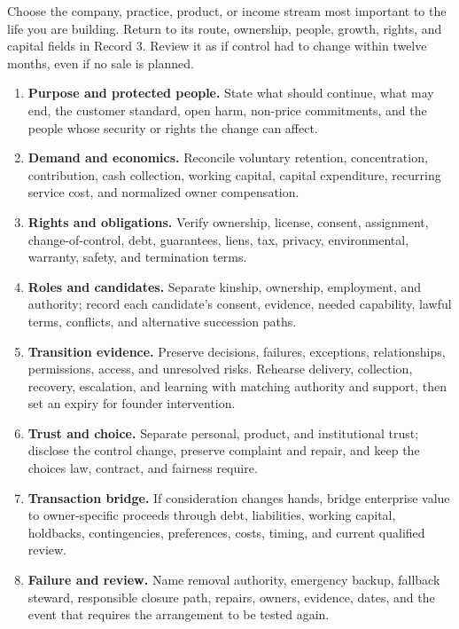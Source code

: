 Choose the company, practice, product, or income stream most important to the
life you are building. Return to its route, ownership, people, growth, rights,
and capital fields in Record 3. Review it as if control had to change within
twelve months, even if no sale is planned.

\begin{enumerate}[itemsep=0.14em]
\item \textbf{Purpose and protected people.} State what should continue, what
  may end, the customer standard, open harm, non-price commitments, and the
  people whose security or rights the change can affect.
\item \textbf{Demand and economics.} Reconcile voluntary retention,
  concentration, contribution, cash collection, working capital, capital
  expenditure, recurring service cost, and normalized owner compensation.
\item \textbf{Rights and obligations.} Verify ownership, license, consent,
  assignment, change-of-control, debt, guarantees, liens, tax, privacy,
  environmental, warranty, safety, and termination terms.
\item \textbf{Roles and candidates.} Separate kinship, ownership, employment,
  and authority; record each candidate's consent, evidence, needed capability,
  lawful terms, conflicts, and alternative succession paths.
\pagebreak
\item \textbf{Transition evidence.} Preserve decisions, failures, exceptions,
  relationships, permissions, access, and unresolved risks. Rehearse delivery,
  collection, recovery, escalation, and learning with matching authority and
  support, then set an expiry for founder intervention.
\item \textbf{Trust and choice.} Separate personal, product, and institutional
  trust; disclose the control change, preserve complaint and repair, and keep
  the choices law, contract, and fairness require.
\item \textbf{Transaction bridge.} If consideration changes hands, bridge
  enterprise value to owner-specific proceeds through debt, liabilities,
  working capital, holdbacks, contingencies, preferences, costs, timing, and
  current qualified review.
\item \textbf{Failure and review.} Name removal authority, emergency backup,
  fallback steward, responsible closure path, repairs, owners, evidence, dates,
  and the event that requires the arrangement to be tested again.
\end{enumerate}

